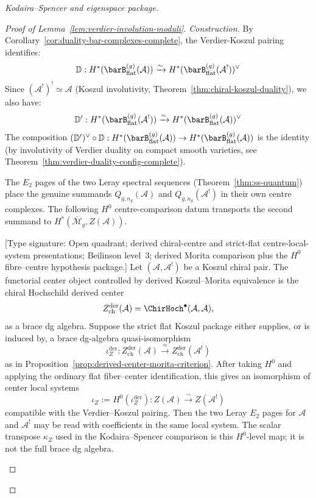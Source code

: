 \begin{proof}[Kodaira--Spencer and eigenspace package]
\begin{proof}[Proof of Lemma~\ref{lem:verdier-involution-moduli}]
\emph{Construction.}
By Corollary~\ref{cor:duality-bar-complexes-complete}, the
Verdier-Koszul pairing identifies:
\begin{equation}
\mathbb{D}: H^*(\barB^{(g)}_{\mathrm{flat}}(\mathcal{A})) \xrightarrow{\sim}
H^*(\barB^{(g)}_{\mathrm{flat}}(\mathcal{A}^!))^\vee
\end{equation}
Since $(\mathcal{A}^!)^! \simeq \mathcal{A}$ (Koszul involutivity,
Theorem~\ref{thm:chiral-koszul-duality}), we also have:
\begin{equation}
\mathbb{D}': H^*(\barB^{(g)}_{\mathrm{flat}}(\mathcal{A}^!)) \xrightarrow{\sim}
H^*(\barB^{(g)}_{\mathrm{flat}}(\mathcal{A}))^\vee
\end{equation}
The composition $(\mathbb{D}')^\vee \circ \mathbb{D}: H^*(\barB^{(g)}_{\mathrm{flat}}(\mathcal{A}))
\to H^*(\barB^{(g)}_{\mathrm{flat}}(\mathcal{A}))$ is the identity (by involutivity of Verdier
duality on compact smooth varieties, see Theorem~\ref{thm:verdier-duality-config-complete}).

The $E_2$ pages of the two Leray spectral sequences
(Theorem~\ref{thm:ss-quantum}) place the genuine summands
$Q_{g,n_g}(\mathcal A)$ and $Q_{g,n_g}(\mathcal A^!)$ in their own
centre complexes.  The following $H^0$ centre-comparison datum
transports the second summand to
$H^*(\overline{\mathcal M}_g,Z(\mathcal A))$.

\begin{lemma}
\label{lem:center-isomorphism}
\textup{[Type signature: Open quadrant; derived chiral-centre and
strict-flat centre-local-system presentations; Beilinson level~3;
derived Morita comparison plus the \(H^0\) fibre--centre hypothesis
package.]}
Let $(\mathcal{A},\mathcal{A}^!)$ be a Koszul chiral pair. The
functorial center object controlled by derived Koszul--Morita
equivalence is the chiral Hochschild derived center
\[
 Z^{\mathrm{der}}_{\mathrm{ch}}(\mathcal A)
 =
 \ChirHoch^\bullet(\mathcal A,\mathcal A),
\]
as a brace dg algebra. Suppose the strict flat Koszul package either
supplies, or is induced by, a brace dg-algebra quasi-isomorphism
\[
  \iota_Z^{\mathrm{der}}\colon
  Z^{\mathrm{der}}_{\mathrm{ch}}(\mathcal A)
  \xrightarrow{\;\simeq\;}
  Z^{\mathrm{der}}_{\mathrm{ch}}(\mathcal A^!)
\]
as in Proposition~\textup{\ref{prop:derived-center-morita-criterion}}.
After taking \(H^0\) and applying the ordinary flat fiber--center
identification, this gives an isomorphism of center local systems
\[
  \iota_Z := H^0(\iota_Z^{\mathrm{der}})
  \colon Z(\mathcal{A}) \xrightarrow{\sim} Z(\mathcal{A}^!)
\]
compatible with the Verdier--Koszul pairing. Then the two Leray
$E_2$ pages for $\mathcal{A}$ and $\mathcal{A}^!$ may be read with
coefficients in the same local system. The scalar transpose
\(\kappa_Z\) used in the Kodaira--Spencer comparison is this
\(H^0\)-level map; it is not the full brace dg algebra.
\end{lemma}


\end{proof}
\end{proof}
